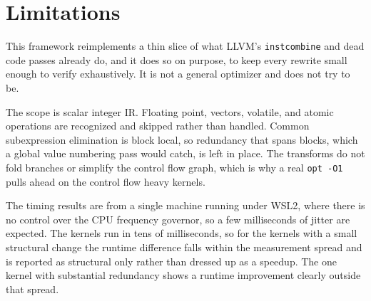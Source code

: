 \section{Limitations}

This framework reimplements a thin slice of what LLVM's \texttt{instcombine} and
dead code passes already do, and it does so on purpose, to keep every rewrite
small enough to verify exhaustively. It is not a general optimizer and does not
try to be.

The scope is scalar integer IR. Floating point, vectors, volatile, and atomic
operations are recognized and skipped rather than handled. Common subexpression
elimination is block local, so redundancy that spans blocks, which a global value
numbering pass would catch, is left in place. The transforms do not fold branches
or simplify the control flow graph, which is why a real \texttt{opt -O1} pulls
ahead on the control flow heavy kernels.

The timing results are from a single machine running under WSL2, where there is
no control over the CPU frequency governor, so a few milliseconds of jitter are
expected. The kernels run in tens of milliseconds, so for the kernels with a
small structural change the runtime difference falls within the measurement
spread and is reported as structural only rather than dressed up as a speedup.
The one kernel with substantial redundancy shows a runtime improvement clearly
outside that spread.
